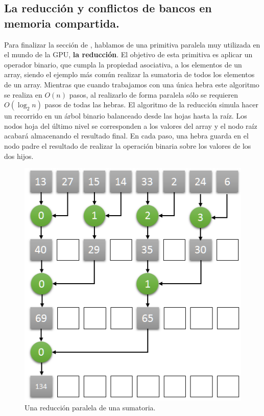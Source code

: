 \subsection{La reducción y conflictos de bancos en memoria compartida.}
Para finalizar la sección de \cudanospace{}, hablamos de una primitiva paralela muy utilizada en el mundo de la GPU, \textbf{la reducción}. El objetivo de esta primitiva es aplicar un operador binario, que cumpla la propiedad asociativa, a los elementos de un array, siendo el ejemplo más común realizar la sumatoria de todos los elementos de un array. Mientras que cuando trabajamos con una única hebra este algoritmo se realiza en $O(n)$ pasos, al realizarlo de forma paralela sólo se requieren $O(\log_2{n})$ pasos de todas las hebras. El algoritmo de la reducción simula hacer un recorrido en un árbol binario balanceado desde las hojas hasta la raíz. Los nodos hoja del último nivel se corresponden a los valores del array y el nodo raíz acabará almacenando el resultado final. En cada paso, una hebra guarda en el nodo padre el resultado de realizar la operación binaria sobre los valores de los dos hijos. 

\begin{figure}[H]
\centering
\includegraphics[scale=0.5]{imagenes/parallel_reduce.png}
\caption{Una reducción paralela de una sumatoria.}
\label{image:reductionsuma}
\end{figure}

